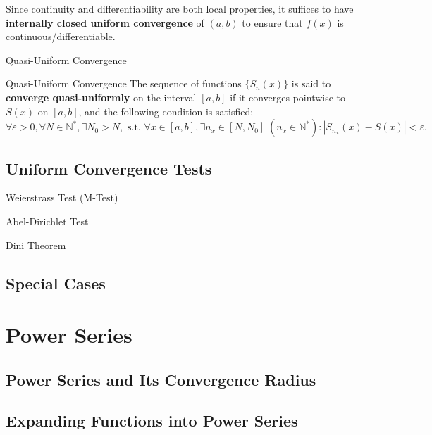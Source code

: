 \documentclass[11pt]{../../TexTemplate/elegantbook}
\begin{document}
\begin{note}
    Since continuity and differentiability are both local properties, 
    it suffices to have \textbf{internally closed uniform convergence} of \( (a, b) \) 
    to ensure that \( f(x) \) is continuous/differentiable.
\end{note}


\begin{leftbarTitle}{Quasi-Uniform Convergence}\end{leftbarTitle}
\begin{definition}{Quasi-Uniform Convergence}
    The sequence of functions \( \{ S_n(x) \} \) is said to \textbf{converge quasi-uniformly}
    on the interval \( [a, b] \) 
    if it converges pointwise to \( S(x) \) on \( [a, b] \), and the following condition is satisfied:
    \[
    \forall \varepsilon > 0, \forall N \in \mathbb{N}^*, \exists N_0 > N,
    \text{ s.t. } \forall x \in [a, b], \exists n_x \in [N, N_0] \; 
    (n_x \in \mathbb{N}^*): |S_{n_x}(x) - S(x)| < \varepsilon.
    \]    
\end{definition}


\section{Uniform Convergence Tests}
\begin{leftbarTitle}{Weierstrass Test (M-Test)}\end{leftbarTitle}

\begin{leftbarTitle}{Abel-Dirichlet Test}\end{leftbarTitle}

\begin{leftbarTitle}{Dini Theorem}\end{leftbarTitle}

\section{Special Cases}

\chapter{Power Series}
\section{Power Series and Its Convergence Radius}

\section{Expanding Functions into Power Series}
\end{document}

